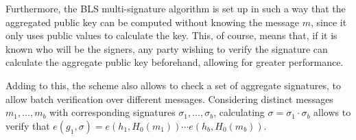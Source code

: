 Furthermore, the BLS multi-signature algorithm is set up in such a way that the aggregated public key can be computed without knowing the message $m$, since it only uses public values to calculate the key. This, of course, means that, if it is known who will be the signers, any party wishing to verify the signature can calculate the aggregate public key beforehand, allowing for greater performance.

Adding to this, the scheme also allows to check a set of aggregate signatures, to allow batch verification over different messages. Considering distinct messages $m_1,\dots,m_b$ with corresponding signatures $\sigma_1,\dots,\sigma_b$, calculating $\sigma=\sigma_1\cdot\sigma_b$ allows to verify that $e(g_1,\sigma)=e(h_1,H_0(m_1))\cdots e(h_b,H_0(m_b))$.